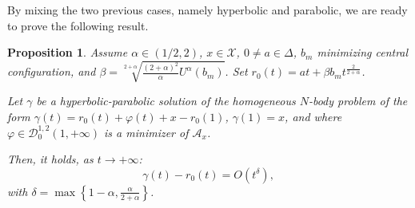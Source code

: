 \documentclass[a4paper,10pt]{amsart}
\theoremstyle{plain}
\newtheorem{prop}[thm]{Proposition}
\theoremstyle{definition}
\numberwithin{equation}{section}
\numberwithin{thm}{section}
\begin{document}
By mixing the two previous cases, namely hyperbolic and parabolic, we are ready to prove the following result.

\begin{prop}
\label{prop:asymp_HP}
Assume $\alpha \in (1/2,2)$, $x \in \mathcal X$, $0\neq a \in \Delta$, $b_m$ minimizing central configuration, and $\beta=\sqrt[2+\alpha]{\frac{(2+\alpha)^2}{\alpha}U^\alpha(b_m)}$. Set $r_0(t)=at + \beta b_m t^\frac{2}{2+\alpha}$.

Let $\gamma$ be a hyperbolic-parabolic solution of the homogeneous $N$-body problem of the form $\gamma(t) = r_0(t) + \varphi(t) + x - r_0(1)$, $\gamma(1)=x$, and where $\varphi\in\mathcal{D}_0^{1,2}(1,+\infty)$ is a minimizer of $\mathcal A_x$.

Then, it holds, as $t \rightarrow+\infty$:
\begin{equation*}
    \gamma(t)-r_0(t)=O(t^{\delta}), 
\end{equation*}
with $\delta=\max\left\{1-\alpha,\frac{\alpha}{2+\alpha}\right\}$.
    
\end{prop}
\end{document}
